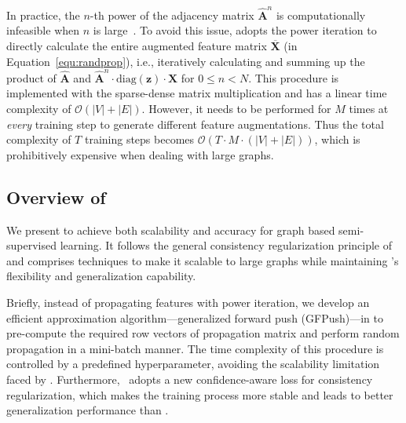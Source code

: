 In practice, the $n$-th power of the adjacency matrix $\hat{\mathbf{A}}^n$ is computationally infeasible when $n$ is large~\cite{qiu2018network}. 
To avoid this issue, \grand adopts the power iteration to directly calculate the entire augmented feature matrix $\overline{\mathbf{X}}$ (in Equation~\ref{equ:randprop}), i.e., iteratively calculating and summing up the product of $\hat{\mathbf{A}}$ and $\hat{\mathbf{A}}^n\cdot\text{diag}(\mathbf{z})\cdot{\mathbf{X}}$ for $0\leq n < N$. This procedure is implemented with the sparse-dense matrix multiplication and has a linear time complexity of $\mathcal{O}(|V| + |E|)$. However, it needs to be performed for $M$ times at \textit{every} training step to generate different feature augmentations. 
Thus the total complexity of $T$ training steps becomes $\mathcal{O}(T\cdot M\cdot (|V|+|E|))$, which is prohibitively expensive when dealing with large graphs.



\subsection{Overview of \model}
\label{sec:overview}


We present \model to 
achieve both scalability and accuracy for graph based semi-supervised learning. 
It follows the general consistency regularization principle of \grand and  
comprises techniques to make it scalable to large graphs 
while maintaining \grand's flexibility and generalization capability. 


Briefly, instead of propagating features with power iteration, 
we develop an efficient approximation algorithm---generalized forward push (GFPush)---in \model to pre-compute the required row vectors of propagation matrix and perform random propagation in a mini-batch manner. 
The time complexity of this procedure is controlled by a predefined hyperparameter, avoiding the scalability limitation faced by \grand. 
Furthermore, \model\ adopts a new confidence-aware loss for consistency regularization, which makes the training process more stable and leads to better generalization performance than \grand. 



